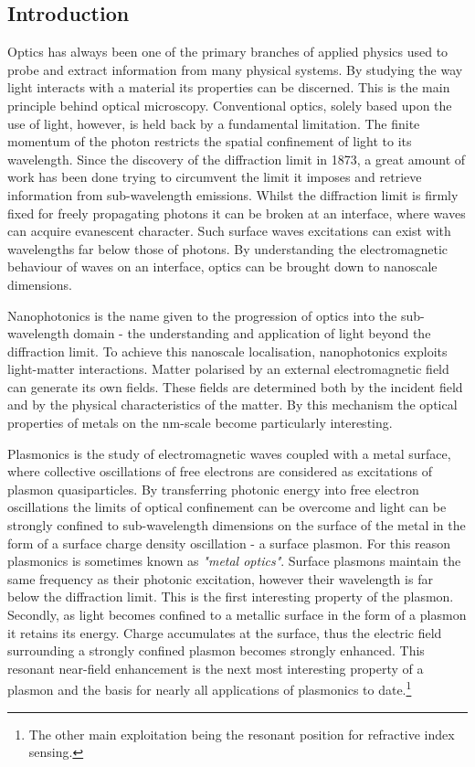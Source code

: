 \documentclass[12pt, a4paper, twoside]{book}
\begin{document}
\begin{singlespace}
\chapter{Introduction}
\end{singlespace}

Optics has always been one of the primary branches of applied physics used to probe and extract information from many physical systems. By studying the way light interacts with a material its properties can be discerned. This is the main principle behind optical microscopy. Conventional optics, solely based upon the use of light, {\color{red}however,} is held back by a fundamental limitation. The finite momentum of the photon restricts the spatial confinement of light to its wavelength. Since the discovery of the diffraction limit in 1873, a great amount of work has been done trying to circumvent the limit it imposes and retrieve information from sub-wavelength emissions. Whilst the diffraction limit is firmly fixed for freely propagating photons it can be broken at an interface, where waves can acquire evanescent character. Such surface waves excitations can exist with wavelengths far below those of photons. By understanding the electromagnetic behaviour of waves on an interface, optics can be brought down to nanoscale dimensions.

Nanophotonics is the name given to the progression of optics into the sub-wavelength domain - the understanding and application of light beyond the diffraction limit. To achieve this nanoscale localisation, nanophotonics exploits light-matter interactions. Matter polarised by an external electromagnetic field can generate its own fields. These fields are determined both by the incident field and by the physical characteristics of the matter. By this mechanism the optical properties of metals on the nm-scale become particularly interesting.

Plasmonics is the study of electromagnetic waves coupled with a metal surface, where collective oscillations of free electrons are considered as excitations of plasmon quasiparticles. By transferring photonic energy into free electron oscillations the limits of optical confinement can be overcome and light can be strongly confined to sub-wavelength dimensions on the surface of the metal in the form of a surface charge density oscillation - a surface plasmon. For this reason plasmonics is sometimes known as \textit{"metal optics"}.
Surface plasmons maintain the same frequency as their photonic excitation, however their wavelength is far below the diffraction limit. This is the first interesting property of the plasmon. Secondly, as light becomes confined to a metallic surface in the form of a plasmon {\color{red}it retains its energy.} Charge accumulates at the surface, thus the electric field surrounding a strongly confined plasmon becomes strongly enhanced. This resonant near-field enhancement is the next most interesting property of a plasmon and the basis for nearly all applications of plasmonics to date.\footnote{The other main exploitation being the resonant position for refractive index sensing.}
\end{document}
